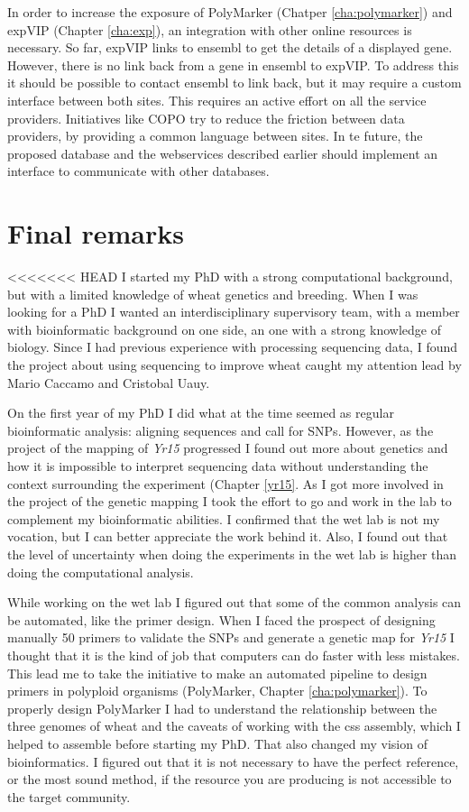 In order to increase the exposure of PolyMarker (Chatper \ref{cha:polymarker}) and expVIP (Chapter \ref{cha:exp}), an integration with other online resources is necessary. 
So far, expVIP links to ensembl to get the details of a displayed gene. 
However, there is no link back from a gene in ensembl to expVIP. 
To address this it should be possible to contact ensembl to link back, but it may require a custom interface between both sites. 
This requires an active effort on all the service providers. 
Initiatives like COPO try to reduce the friction between data providers, by providing a common language between sites. 
In te future, the proposed database and the webservices described earlier should implement an interface to communicate with other databases. 

\section{Final remarks}

<<<<<<< HEAD
I started my PhD with a strong computational background, but with a limited knowledge of wheat genetics and breeding.
When I was looking for a PhD I wanted an interdisciplinary supervisory team, with a member with bioinformatic background on one side, an one with a strong knowledge of biology. 
Since I had previous experience with processing sequencing data, I found the project about using sequencing to improve wheat caught my attention lead by Mario Caccamo and Cristobal Uauy. 

On the first year of my PhD I did what at the time seemed as regular bioinformatic analysis: aligning sequences and call for SNPs. 
However, as the project of the mapping of \textit{Yr15} progressed I found out more about genetics and how it is impossible to interpret sequencing data without understanding the context surrounding the experiment (Chapter \ref{yr15}. 
As I got more involved in the project of the genetic mapping I took the effort to go and work in the lab to complement my bioinformatic abilities. 
I confirmed that the wet lab is not my vocation, but I can better appreciate the work behind it. 
Also, I found out that the level of uncertainty when doing the experiments in the wet lab is higher than doing the computational analysis. 

While working on the wet lab I figured out that some of the common analysis can be automated, like the primer design. 
When I faced the prospect of designing manually 50 primers to validate the SNPs and generate a genetic map for \textit{Yr15} I thought that it is the kind of job that computers can do faster with less mistakes. 
This lead me to take the initiative to make an automated pipeline to design primers in polyploid organisms (PolyMarker, Chapter \ref{cha:polymarker}).
To properly design PolyMarker I had to understand the relationship between the three genomes of wheat and the caveats of working with the \acrshort{css} assembly, which I helped to assemble before starting my PhD. 
That also changed my vision of bioinformatics. 
I figured out that it is not necessary to have the perfect reference, or the most sound method, if the resource you are producing is not accessible to the target community. 

